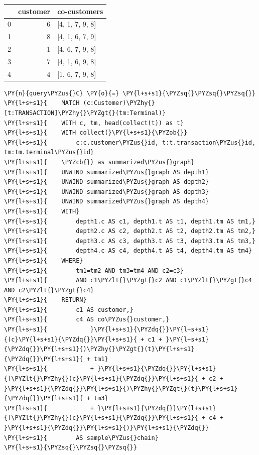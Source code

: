     \begin{center}
\begin{tabular}{lrl}
\toprule
 & customer & co-customers \\
\midrule
0 & 6 & [4, 1, 7, 9, 8] \\
1 & 8 & [4, 1, 6, 7, 9] \\
2 & 1 & [4, 6, 7, 9, 8] \\
3 & 7 & [4, 1, 6, 9, 8] \\
4 & 4 & [1, 6, 7, 9, 8] \\
\bottomrule
\end{tabular}

\end{center}

    

    \begin{tcolorbox}[breakable, size=fbox, boxrule=1pt, pad at break*=1mm,colback=cellbackground, colframe=cellborder]
\begin{Verbatim}[commandchars=\\\{\}]
\PY{n}{query\PYZus{}C} \PY{o}{=} \PY{l+s+s1}{\PYZsq{}\PYZsq{}\PYZsq{}}
\PY{l+s+s1}{    MATCH (c:Customer)\PYZhy{}[t:TRANSACTION]\PYZhy{}\PYZgt{}(tm:Terminal)}
\PY{l+s+s1}{    WITH c, tm, head(collect(t)) as t}
\PY{l+s+s1}{    WITH collect(}\PY{l+s+s1}{\PYZob{}}
\PY{l+s+s1}{        c:c.customer\PYZus{}id, t:t.transaction\PYZus{}id, tm:tm.terminal\PYZus{}id}
\PY{l+s+s1}{    \PYZcb{}) as summarized\PYZus{}graph}
\PY{l+s+s1}{    UNWIND summarized\PYZus{}graph AS depth1}
\PY{l+s+s1}{    UNWIND summarized\PYZus{}graph AS depth2}
\PY{l+s+s1}{    UNWIND summarized\PYZus{}graph AS depth3}
\PY{l+s+s1}{    UNWIND summarized\PYZus{}graph AS depth4}
\PY{l+s+s1}{    WITH}
\PY{l+s+s1}{        depth1.c AS c1, depth1.t AS t1, depth1.tm AS tm1,}
\PY{l+s+s1}{        depth2.c AS c2, depth2.t AS t2, depth2.tm AS tm2,}
\PY{l+s+s1}{        depth3.c AS c3, depth3.t AS t3, depth3.tm AS tm3,}
\PY{l+s+s1}{        depth4.c AS c4, depth4.t AS t4, depth4.tm AS tm4}
\PY{l+s+s1}{    WHERE}
\PY{l+s+s1}{        tm1=tm2 AND tm3=tm4 AND c2=c3}
\PY{l+s+s1}{        AND c1\PYZlt{}\PYZgt{}c2 AND c1\PYZlt{}\PYZgt{}c4 AND c2\PYZlt{}\PYZgt{}c4}
\PY{l+s+s1}{    RETURN}
\PY{l+s+s1}{        c1 AS customer,}
\PY{l+s+s1}{        c4 AS co\PYZus{}customer,}
\PY{l+s+s1}{            }\PY{l+s+s1}{\PYZdq{}}\PY{l+s+s1}{(c}\PY{l+s+s1}{\PYZdq{}}\PY{l+s+s1}{ + c1 + }\PY{l+s+s1}{\PYZdq{}}\PY{l+s+s1}{)\PYZhy{}\PYZgt{}(t}\PY{l+s+s1}{\PYZdq{}}\PY{l+s+s1}{ + tm1}
\PY{l+s+s1}{            + }\PY{l+s+s1}{\PYZdq{}}\PY{l+s+s1}{)\PYZlt{}\PYZhy{}(c}\PY{l+s+s1}{\PYZdq{}}\PY{l+s+s1}{ + c2 + }\PY{l+s+s1}{\PYZdq{}}\PY{l+s+s1}{)\PYZhy{}\PYZgt{}(t}\PY{l+s+s1}{\PYZdq{}}\PY{l+s+s1}{ + tm3}
\PY{l+s+s1}{            + }\PY{l+s+s1}{\PYZdq{}}\PY{l+s+s1}{)\PYZlt{}\PYZhy{}(c}\PY{l+s+s1}{\PYZdq{}}\PY{l+s+s1}{ + c4 + }\PY{l+s+s1}{\PYZdq{}}\PY{l+s+s1}{)}\PY{l+s+s1}{\PYZdq{}}
\PY{l+s+s1}{        AS sample\PYZus{}chain}
\PY{l+s+s1}{\PYZsq{}\PYZsq{}\PYZsq{}}
\end{Verbatim}
\end{tcolorbox}

